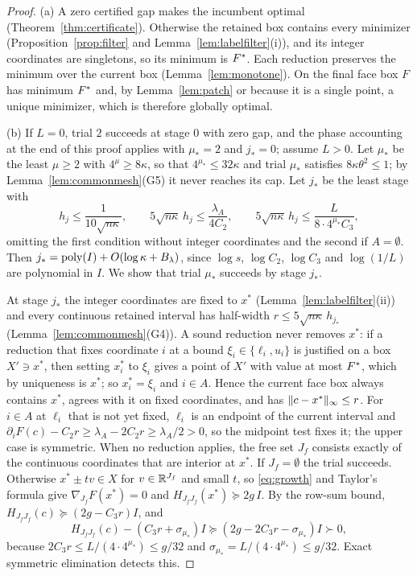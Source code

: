 \begin{proof}
(a) A zero certified gap makes the incumbent optimal
(Theorem~\ref{thm:certificate}). Otherwise the retained box contains every
minimizer (Proposition~\ref{prop:filter} and Lemma~\ref{lem:labelfilter}(i)),
and its integer coordinates are singletons, so its minimum is $F^{*}$. Each
reduction preserves the minimum over the current box
(Lemma~\ref{lem:monotone}). On the final face box $F$ has minimum $F^{*}$ and,
by Lemma~\ref{lem:patch} or because it is a single point, a unique minimizer,
which is therefore globally optimal.

(b) If $L=0$, trial $2$ succeeds at stage $0$ with zero gap, and the phase
accounting at the end of this proof applies with $\mu_*=2$ and $j_*=0$;
assume $L>0$.
Let $\mu_*$ be the least $\mu\ge2$ with $4^\mu\ge8\kappa$, so that
$4^{\mu_*}\le32\kappa$ and trial $\mu_*$ satisfies $8\kappa\theta^2\le1$; by
Lemma~\ref{lem:commonmesh}(G5) it never reaches its cap. Let $j_*$ be the least
stage with
\[
h_j\le\frac1{10\sqrt{n\kappa}},\qquad
5\sqrt{n\kappa}\,h_j\le\frac{\lambda_A}{4C_2},\qquad
5\sqrt{n\kappa}\,h_j\le\frac L{8\cdot4^{\mu_*}C_3},
\]
omitting the first condition without integer coordinates and the second if
$A=\emptyset$. Then $j_*=\operatorname{poly}(I)+O(\log\kappa+B_\lambda)$, since
$\log s$, $\log C_2$, $\log C_3$ and $\log(1/L)$ are polynomial in $I$. We
show that trial $\mu_*$ succeeds by stage $j_*$.

At stage $j_*$ the integer coordinates are fixed to $x^*$
(Lemma~\ref{lem:labelfilter}(ii)) and every continuous retained interval has
half-width $r\le5\sqrt{n\kappa}\,h_{j_*}$ (Lemma~\ref{lem:commonmesh}(G4)). A
sound reduction never removes $x^*$: if a reduction that fixes coordinate $i$
at a bound $\xi_i\in\{\ell_i,u_i\}$ is justified on a box $X'\ni x^*$, then
setting $x^*_i$ to $\xi_i$ gives a point of $X'$ with value at most $F^{*}$,
which by uniqueness is $x^*$; so $x^*_i=\xi_i$ and $i\in A$. Hence the
current face box always contains $x^*$, agrees with it on fixed coordinates,
and has
$\lVert c-x^*\rVert_\infty\le r$. For $i\in A$ at $\ell_i$ that is not yet
fixed, $\ell_i$ is an endpoint of the current interval and
$\partial_iF(c)-C_2r\ge\lambda_A-2C_2r\ge\lambda_A/2>0$, so the midpoint test
fixes it; the upper case is symmetric. When no reduction applies, the free
set $J_f$ consists exactly of the continuous coordinates that are interior at
$x^*$. If $J_f=\emptyset$ the trial succeeds. Otherwise $x^*\pm tv\in X$ for
$v\in\mathbb R^{J_f}$ and small $t$, so \eqref{eq:growth} and Taylor's formula give
$\nabla_{J_f}F(x^*)=0$ and $H_{J_fJ_f}(x^*)\succeq2g\,I$. By the row-sum bound,
$H_{J_fJ_f}(c)\succeq(2g-C_3r)I$, and
\[
H_{J_fJ_f}(c)-(C_3r+\sigma_{\mu_*})I\succeq(2g-2C_3r-\sigma_{\mu_*})I
\succ0,
\]
because $2C_3r\le L/(4\cdot4^{\mu_*})\le g/32$ and
$\sigma_{\mu_*}=L/(4\cdot4^{\mu_*})\le g/32$. Exact symmetric elimination
detects this.


\end{proof}
